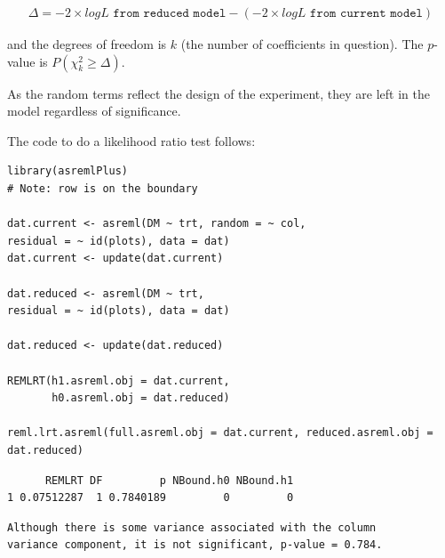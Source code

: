 \documentclass[a4paper, 10pt, fleqn, twosided]{memoir}
\begin{document}
\begin{eqnarray*}
\Delta = -2 \times logL \texttt{ from reduced model} - (-2 \times logL \texttt{ from current model})
\end{eqnarray*}


and the degrees of freedom is $k$ (the number of coefficients in question). The $p$-value is $P(\chi^2_k \geq \Delta)$.

As the random terms reflect the design of the experiment, they are left in the model regardless of significance.

The code to do a likelihood ratio test follows:

\begin{tcolorbox}[title = Example 4 Likelihood Ratio Test]
\begin{verbatim}
library(asremlPlus)
# Note: row is on the boundary

dat.current <- asreml(DM ~ trt, random = ~ col,
residual = ~ id(plots), data = dat)
dat.current <- update(dat.current)

dat.reduced <- asreml(DM ~ trt,
residual = ~ id(plots), data = dat)

dat.reduced <- update(dat.reduced)

REMLRT(h1.asreml.obj = dat.current,
       h0.asreml.obj = dat.reduced)

reml.lrt.asreml(full.asreml.obj = dat.current, reduced.asreml.obj = dat.reduced)
\end{verbatim}
\end{tcolorbox}

\begin{tcolorbox}[title = Example 4 Likelihood Ratio Test output]
\begin{verbatim}
      REMLRT DF         p NBound.h0 NBound.h1
1 0.07512287  1 0.7840189         0         0
\end{verbatim}
\end{tcolorbox}

\begin{tcolorbox}[title = Example 4 Likelihood Ratio Test Interpretation]
\begin{verbatim}
Although there is some variance associated with the column
variance component, it is not significant, p-value = 0.784.
\end{verbatim}
\end{tcolorbox}
\end{document}
